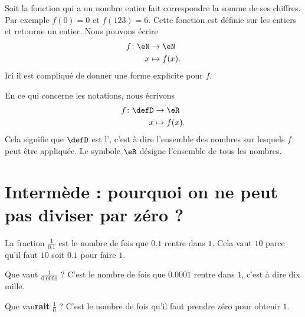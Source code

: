 \begin{example}
    Soit la fonction qui a un nombre entier fait correspondre la somme de ses chiffres. Par exemple \( f(0)=0\) et \( f(123)=6\). Cette fonction est définie sur les entiers et retourne un entier. Nous pouvons écrire
    \begin{equation}
        \begin{aligned}
            f\colon \eN&\to \eN \\
            x&\mapsto f(x). 
        \end{aligned}
    \end{equation}
    Ici il est compliqué de donner une forme explicite pour \( f\).
\end{example}


En ce qui concerne les notations, nous écrivons
\begin{equation}
    \begin{aligned}
        f\colon \defD&\to \eR \\
        x&\mapsto f(x). 
    \end{aligned}
\end{equation}
Cela signifie que \( \defD\) est l', c'est à dire l'ensemble des nombres sur lesquels \( f\) peut être appliquée. Le symbole \( \eR\) désigne l'ensemble de tous les nombres.

\section{Intermède : pourquoi on ne peut pas diviser par zéro ?}

La fraction \( \frac{1}{ 0.1 }\) est le nombre de fois que \( 0.1\) rentre dans \( 1\). Cela vaut \( 10\) parce qu'il faut \( 10\) soit \( 0.1\) pour faire \( 1\).

Que vaut \( \frac{1}{ 0.0001 }\) ? C'est le nombre de fois que \( 0.0001\) rentre dans \( 1\), c'est à dire dix mille.

Que vau{\bf rait} \( \frac{1}{ 0 }\) ? C'est le nombre de fois qu'il faut prendre zéro pour obtenir \( 1\).

